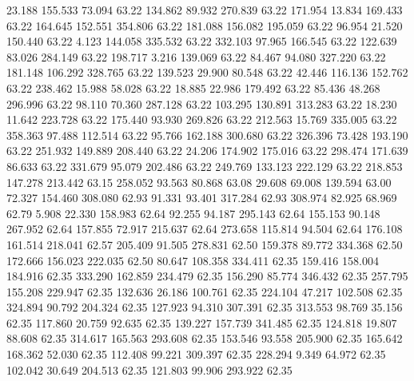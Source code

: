   23.188  155.533   73.094        63.22
 134.862   89.932  270.839        63.22
 171.954   13.834  169.433        63.22
 164.645  152.551  354.806        63.22
 181.088  156.082  195.059        63.22
  96.954   21.520  150.440        63.22
   4.123  144.058  335.532        63.22
 332.103   97.965  166.545        63.22
 122.639   83.026  284.149        63.22
 198.717    3.216  139.069        63.22
  84.467   94.080  327.220        63.22
 181.148  106.292  328.765        63.22
 139.523   29.900   80.548        63.22
  42.446  116.136  152.762        63.22
 238.462   15.988   58.028        63.22
  18.885   22.986  179.492        63.22
  85.436   48.268  296.996        63.22
  98.110   70.360  287.128        63.22
 103.295  130.891  313.283        63.22
  18.230   11.642  223.728        63.22
 175.440   93.930  269.826        63.22
 212.563   15.769  335.005        63.22
 358.363   97.488  112.514        63.22
  95.766  162.188  300.680        63.22
 326.396   73.428  193.190        63.22
 251.932  149.889  208.440        63.22
  24.206  174.902  175.016        63.22
 298.474  171.639   86.633        63.22
 331.679   95.079  202.486        63.22
 249.769  133.123  222.129        63.22
 218.853  147.278  213.442        63.15
 258.052   93.563   80.868        63.08
  29.608   69.008  139.594        63.00
  72.327  154.460  308.080        62.93
  91.331   93.401  317.284        62.93
 308.974   82.925   68.969        62.79
   5.908   22.330  158.983        62.64
  92.255   94.187  295.143        62.64
 155.153   90.148  267.952        62.64
 157.855   72.917  215.637        62.64
 273.658  115.814   94.504        62.64
 176.108  161.514  218.041        62.57
 205.409   91.505  278.831        62.50
 159.378   89.772  334.368        62.50
 172.666  156.023  222.035        62.50
  80.647  108.358  334.411        62.35
 159.416  158.004  184.916        62.35
 333.290  162.859  234.479        62.35
 156.290   85.774  346.432        62.35
 257.795  155.208  229.947        62.35
 132.636   26.186  100.761        62.35
 224.104   47.217  102.508        62.35
 324.894   90.792  204.324        62.35
 127.923   94.310  307.391        62.35
 313.553   98.769   35.156        62.35
 117.860   20.759   92.635        62.35
 139.227  157.739  341.485        62.35
 124.818   19.807   88.608        62.35
 314.617  165.563  293.608        62.35
 153.546   93.558  205.900        62.35
 165.642  168.362   52.030        62.35
 112.408   99.221  309.397        62.35
 228.294    9.349   64.972        62.35
 102.042   30.649  204.513        62.35
 121.803   99.906  293.922        62.35
